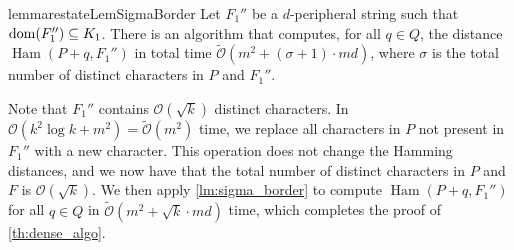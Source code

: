 \documentclass[a4paper,11pt]{article}
\renewcommand{\O}{\mathcal{O}}
\newcommand{\tO}{\tilde{\mathcal{O}}}
\DeclareMathOperator*{\Ham}{Ham}
\begin{document}
\begin{restatable}{lemma}{restateLemSigmaBorder}\label{lm:sigma_border}
Let $F_1''$ be a $d$-peripheral string such that $\operatorname*{dom}(F_1'') \subseteq K_1$. There is an algorithm that computes, for all $q \in Q$, the distance $\Ham(P + q, F_1'')$ in total time $\tO(m^2 + (\sigma+1) \cdot md)$, where $\sigma$ is the total number of distinct characters in $P$ and $F_1''$.
\end{restatable}

Note that $F_1''$ contains $\O(\sqrt{k})$ distinct characters. In $\O(k^2 \log k + m^2) = \tO(m^2)$ time, we replace all characters in $P$ not present in $F_1''$ with a new character. This operation does not change the Hamming distances, and we now have that the total number of distinct characters in $P$ and $F$ is $\O(\sqrt{k})$. We then apply \cref{lm:sigma_border} to compute $\Ham(P + q, F_1'')$ for all $q \in Q$ in $\tO(m^2 + \sqrt k \cdot md)$ time, which completes the proof of \cref{th:dense_algo}. 
\end{document}
